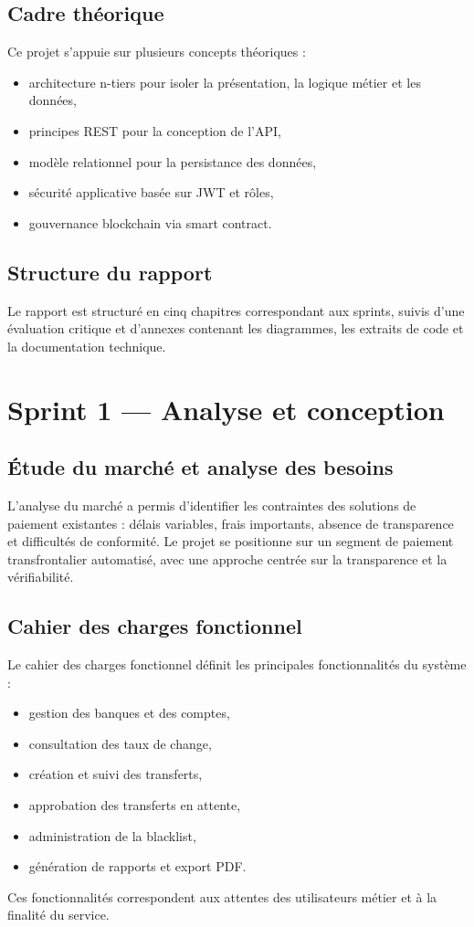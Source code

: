 \documentclass[a4paper,12pt]{report}
\begin{document}
\section{Cadre théorique}
Ce projet s'appuie sur plusieurs concepts théoriques :
\begin{itemize}[leftmargin=*,nosep]
  \item architecture n-tiers pour isoler la présentation, la logique métier et les données,
  \item principes REST pour la conception de l'API,
  \item modèle relationnel pour la persistance des données,
  \item sécurité applicative basée sur JWT et rôles,
  \item gouvernance blockchain via smart contract.
\end{itemize}

\section{Structure du rapport}
Le rapport est structuré en cinq chapitres correspondant aux sprints, suivis d'une évaluation critique et d'annexes contenant les diagrammes, les extraits de code et la documentation technique.

\chapter{Sprint 1 --- Analyse et conception}
\section{Étude du marché et analyse des besoins}
L'analyse du marché a permis d'identifier les contraintes des solutions de paiement existantes : délais variables, frais importants, absence de transparence et difficultés de conformité. Le projet se positionne sur un segment de paiement transfrontalier automatisé, avec une approche centrée sur la transparence et la vérifiabilité.

\section{Cahier des charges fonctionnel}
Le cahier des charges fonctionnel définit les principales fonctionnalités du système :
\begin{itemize}[leftmargin=*,nosep]
  \item gestion des banques et des comptes,
  \item consultation des taux de change,
  \item création et suivi des transferts,
  \item approbation des transferts en attente,
  \item administration de la blacklist,
  \item génération de rapports et export PDF.
\end{itemize}
Ces fonctionnalités correspondent aux attentes des utilisateurs métier et à la finalité du service.
\end{document}
